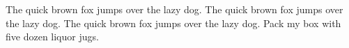 %
\hsize=6.5in
\vsize=8.9in
\nopagenumbers
\noindent
The quick brown fox jumps over the lazy dog. The quick brown fox jumps
over the lazy dog. The quick brown fox jumps over the lazy dog. Pack my
box with five dozen liquor jugs.
\par
\bye

